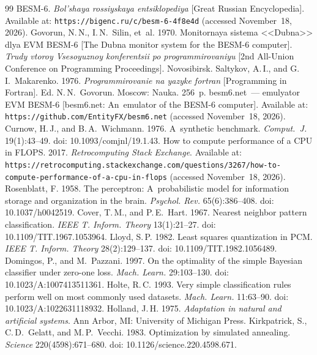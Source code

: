 \documentclass[a4paper,12pt]{article}
\begin{document}
{\small\frenchspacing
  \begin{thebibliography}{99}
BESM-6. \textit{Bol'shaya rossiyskaya entsiklopediya} [Great Russian Encyclopedia]. Available at: \texttt{https://bigenc.ru/c/besm-6-4f8e4d} (accessed November~18, 2026).
Govorun, N.\,N., I.\,N.~Silin, et~al. 1970. Monitornaya sistema <<Dubna>> dlya EVM BESM-6 [The Dubna monitor system for the BESM-6 computer]. \textit{Trudy vtoroy Vsesoyuznoy konferentsii po programmirovaniyu} [2nd All-Union Conference on Programming Proceedings]. Novosibirsk.
Saltykov, A.\,I., and G.\,I.~Makarenko. 1976. \textit{Programmirovanie na yazyke fortran} [Programming in Fortran]. Ed. N.\,N.~Govorun. Moscow: Nauka. 256~p.
besm6.net~--- emulyator EVM BESM-6 [besm6.net: An~emulator of the BESM-6 computer]. Available at: \texttt{https://github.com/EntityFX/besm6.net} (accessed November~18, 2026).
Curnow, H.\,J., and B.\,A.~Wichmann. 1976. A~synthetic benchmark. \textit{Comput.~J.} 19(1):43--49. doi: 10.1093/comjnl/19.1.43.
How to compute performance of a CPU in FLOPS. 2017. \textit{Retrocomputing Stack Exchange}. Available at: \texttt{https://retrocomputing.stackexchange.com/\allowbreak{}questions/3267/\allowbreak{}how-to-compute-performance-of-a-cpu-in-flops} (accessed November~18, 2026).
Rosenblatt, F. 1958. The perceptron: A~probabilistic model for information storage and organization in the brain. \textit{Psychol. Rev.} 65(6):386--408. doi: 10.1037/h0042519.
Cover, T.\,M., and P.\,E.~Hart. 1967. Nearest neighbor pattern classification. \textit{IEEE T. Inform. Theory} 13(1):21--27. doi: 10.1109/TIT.1967.1053964.
Lloyd, S.\,P. 1982. Least squares quantization in PCM. \textit{IEEE T. Inform. Theory} 28(2):129--137. doi: 10.1109/TIT.1982.1056489.
Domingos, P., and M.~Pazzani. 1997. On the optimality of the simple Bayesian classifier under zero-one loss. \textit{Mach. Learn.} 29:103--130. doi: 10.1023/A:1007413511361.
Holte, R.\,C. 1993. Very simple classification rules perform well on most commonly used datasets. \textit{Mach. Learn.} 11:63--90. doi: 10.1023/A:1022631118932.
Holland, J.\,H. 1975. \textit{Adaptation in natural and artificial systems}. Ann Arbor, MI: University of Michigan Press.
Kirkpatrick, S., C.\,D.~Gelatt, and M.\,P.~Vecchi. 1983. Optimization by simulated annealing. \textit{Science} 220(4598):671--680. doi: 10.1126/science.220.4598.671.

\end{thebibliography}}
\end{document}
